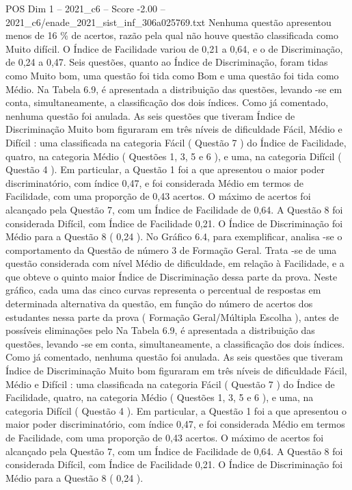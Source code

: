 \begin{textsample}{POS Dim 1 – 2021\_c6 – Score -2.00 – 2021\_c6/enade\_2021\_sist\_inf\_306a025769.txt}
Nenhuma questão apresentou menos de 16 \% de acertos, razão pela qual não houve questão classificada como Muito difícil.
O Índice de Facilidade variou de 0,21 a 0,64, e o de Discriminação, de 0,24 a 0,47.
Seis questões, quanto ao Índice de Discriminação, foram tidas como Muito bom, uma questão foi tida como Bom e uma questão foi tida como Médio.
Na Tabela 6.9, é apresentada a distribuição das questões, levando -se em conta, simultaneamente, a classificação dos dois índices.
Como já comentado, nenhuma questão foi anulada.
As seis questões que tiveram Índice de Discriminação Muito bom figuraram em três níveis de dificuldade Fácil, Médio e Difícil : uma classificada na categoria Fácil ( Questão 7 ) do Índice de Facilidade, quatro, na categoria Médio ( Questões 1, 3, 5 e 6 ), e uma, na categoria Difícil ( Questão 4 ).
Em particular, a Questão 1 foi a que apresentou o maior poder discriminatório, com índice 0,47, e foi considerada Médio em termos de Facilidade, com uma proporção de 0,43 acertos.
O máximo de acertos foi alcançado pela Questão 7, com um Índice de Facilidade de 0,64.
A Questão 8 foi considerada Difícil, com Índice de Facilidade 0,21.
O Índice de Discriminação foi Médio para a Questão 8 ( 0,24 ).
No Gráfico 6.4, para exemplificar, analisa -se o comportamento da Questão de número 3 de Formação Geral.
Trata -se de uma questão considerada com nível Médio de dificuldade, em relação à Facilidade, e a que obteve o quinto maior Índice de Discriminação dessa parte da prova.
Neste gráfico, cada uma das cinco curvas representa o percentual de respostas em determinada alternativa da questão, em função do número de acertos dos estudantes nessa parte da prova ( Formação Geral/Múltipla Escolha ), antes de possíveis eliminações pelo Na Tabela 6.9, é apresentada a distribuição das questões, levando -se em conta, simultaneamente, a classificação dos dois índices.
Como já comentado, nenhuma questão foi anulada.
As seis questões que tiveram Índice de Discriminação Muito bom figuraram em três níveis de dificuldade Fácil, Médio e Difícil : uma classificada na categoria Fácil ( Questão 7 ) do Índice de Facilidade, quatro, na categoria Médio ( Questões 1, 3, 5 e 6 ), e uma, na categoria Difícil ( Questão 4 ).
Em particular, a Questão 1 foi a que apresentou o maior poder discriminatório, com índice 0,47, e foi considerada Médio em termos de Facilidade, com uma proporção de 0,43 acertos.
O máximo de acertos foi alcançado pela Questão 7, com um Índice de Facilidade de 0,64.
A Questão 8 foi considerada Difícil, com Índice de Facilidade 0,21.
O Índice de Discriminação foi Médio para a Questão 8 ( 0,24 ).

\end{textsample}
